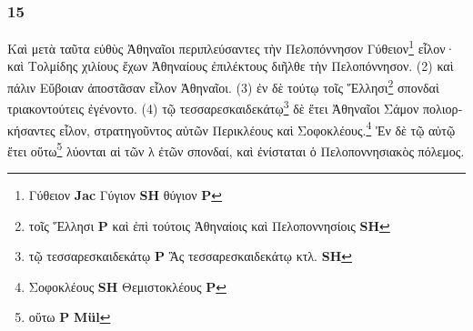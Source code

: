 \subsubsection*{15} \textgreek{Καὶ μετὰ ταῦτα εὐθὺς Ἀθηναῖοι περιπλεύσαντες τὴν Πελοπόννησον Γύθειον}\footnote{\textgreek{Γύθειον} \textbf{Jac} \textgreek{Γύγιον}  \textbf{SH} \textgreek{θύγιον}  \textbf{P}} \textgreek{εἷλον· καὶ Τολμίδης χιλίους ἔχων Ἀθηναίους ἐπιλέκτους διῆλθε τὴν Πελοπόννησον. (2) καὶ πάλιν Εὔβοιαν ἀποστᾶσαν εἷλον Ἀθηναῖοι. (3) ἐν δὲ τούτῳ τοῖς Ἕλλησι}\footnote{\textgreek{τοῖς Ἕλλησι}  \textbf{P} \textgreek{καὶ ἐπὶ τούτοις Ἀθηναίοις καὶ Πελοποννησίοις}  \textbf{SH}} \textgreek{σπονδαὶ τριακοντούτεις ἐγένοντο. (4) τῷ τεσσαρεσκαιδεκάτῳ}\footnote{\textgreek{τῷ τεσσαρεσκαιδεκάτῳ}  \textbf{P} \textgreek{Ἃς τεσσαρεσκαιδεκάτῳ κτλ.}  \textbf{SH}} \textgreek{δὲ ἔτει Ἀθηναῖοι Σάμον πολιορκήσαντες εἷλον, στρατηγοῦντος αὐτῶν Περικλέους καὶ Σοφοκλέους.}\footnote{\textgreek{Σοφοκλέους}  \textbf{SH} \textgreek{Θεμιστοκλέους}  \textbf{P}} \textgreek{Ἐν δὲ τῷ αὐτῷ ἔτει οὕτω}\footnote{\textgreek{οὕτω}  \textbf{P} \textgreek{} \textbf{Mül}} \textgreek{λύονται αἱ τῶν λ ἐτῶν σπονδαί, καὶ ἐνίσταται ὁ Πελοποννησιακὸς πόλεμος.}


